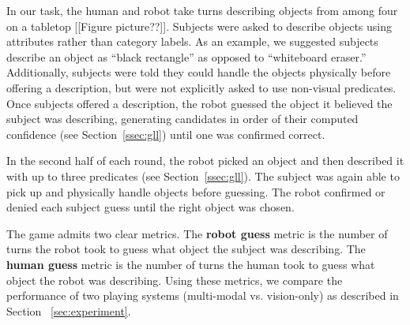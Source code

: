 In our \ispy task, the human and robot take turns describing objects from among
four on a tabletop [[Figure picture??]].  Subjects were asked to describe
objects using attributes rather than category labels.  As an example, we
suggested subjects describe an object as ``black rectangle'' as opposed to
``whiteboard eraser.''  Additionally, subjects were told they could handle the
objects physically before offering a description, but were not explicitly asked
to use non-visual predicates.  Once subjects offered a description, the robot
guessed the object it believed the subject was describing, generating
candidates in order of their computed confidence (see Section~\ref{ssec:gll})
until one was confirmed correct.

In the second half of each round, the robot picked an object and then described
it with up to three predicates (see Section~\ref{ssec:gll}).  The subject was
again able to pick up and physically handle objects before guessing.  The robot
confirmed or denied each subject guess until the right object was chosen.

The \ispy game admits two clear metrics.  The \textbf{robot guess} metric is
the number of turns the robot took to guess what object the subject was
describing.  The \textbf{human guess} metric is the number of turns the human
took to guess what object the robot was describing.  Using these metrics, we
compare the performance of two \ispy playing systems (multi-modal
vs. vision-only) as described in Section ~\ref{sec:experiment}.
